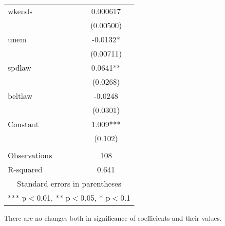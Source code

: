 \documentclass[a4paper]{article}
\begin{document}
\begin{enumerate}[(i)]
\begin{center}
\begin{tabular}{lc}
		wkends & 0.000617 \\
		& (0.00500) \\
		unem & -0.0132* \\
		& (0.00711) \\
		spdlaw & 0.0641** \\
		& (0.0268) \\
		beltlaw & -0.0248 \\
		& (0.0301) \\
		Constant & 1.009*** \\
		& (0.102) \\
		&  \\
		Observations & 108 \\
		R-squared & 0.641 \\ \hline
		\multicolumn{2}{c}{ Standard errors in parentheses} \\
		\multicolumn{2}{c}{ *** p$<$0.01, ** p$<$0.05, * p$<$0.1} \\
	\end{tabular}
\end{center}
There are no changes both in significance of coefficients and their values.
\end{enumerate}
\end{document}
